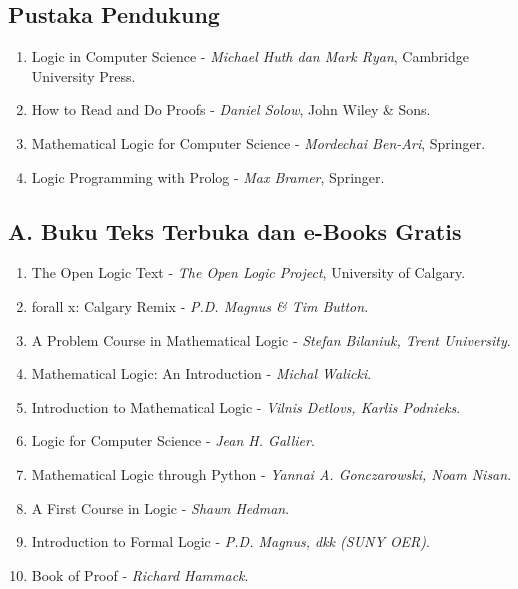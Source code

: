 \documentclass[12pt,a4paper]{article}
\begin{document}
\subsection*{Pustaka Pendukung}
\begin{enumerate}[leftmargin=*, label={PP\arabic*.}]
  \item Logic in Computer Science - \textit{Michael Huth dan Mark Ryan}, Cambridge University Press.
  \item How to Read and Do Proofs - \textit{Daniel Solow}, John Wiley \& Sons.
  \item Mathematical Logic for Computer Science - \textit{Mordechai Ben-Ari}, Springer.
  \item Logic Programming with Prolog - \textit{Max Bramer}, Springer.
\end{enumerate}

\subsection*{A. Buku Teks Terbuka dan e-Books Gratis}
\begin{enumerate}[leftmargin=*, label={A\arabic*.}]
  \item The Open Logic Text - \textit{The Open Logic Project}, University of Calgary.
  \item forall x: Calgary Remix - \textit{P.D. Magnus \& Tim Button}.
  \item A Problem Course in Mathematical Logic - \textit{Stefan Bilaniuk, Trent University}.
  \item Mathematical Logic: An Introduction - \textit{Michal Walicki}.
  \item Introduction to Mathematical Logic - \textit{Vilnis Detlovs, Karlis Podnieks}.
  \item Logic for Computer Science - \textit{Jean H. Gallier}.
  \item Mathematical Logic through Python - \textit{Yannai A. Gonczarowski, Noam Nisan}.
  \item A First Course in Logic - \textit{Shawn Hedman}.
  \item Introduction to Formal Logic - \textit{P.D. Magnus, dkk (SUNY OER)}.
  \item Book of Proof - \textit{Richard Hammack}.
\end{enumerate}
\end{document}
